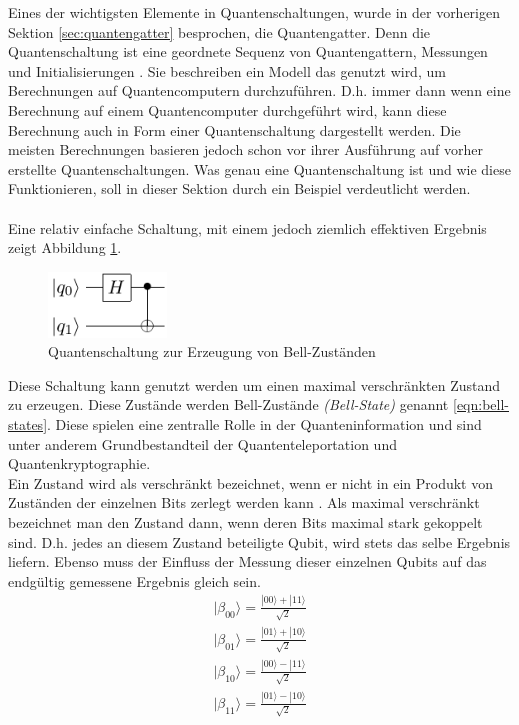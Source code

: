 Eines der wichtigsten Elemente in Quantenschaltungen, wurde in der vorherigen Sektion \ref{sec:quantengatter} besprochen, die Quantengatter. Denn die Quantenschaltung ist eine geordnete Sequenz von Quantengattern, Messungen und Initialisierungen \cite{Qiskit-Textbook}. Sie beschreiben ein Modell das genutzt wird, um Berechnungen auf Quantencomputern durchzuf\"uhren. D.h. immer dann wenn eine Berechnung auf einem Quantencomputer durchgef\"uhrt wird, kann diese Berechnung auch in Form einer Quantenschaltung dargestellt werden. Die meisten Berechnungen basieren jedoch schon vor ihrer Ausf\"uhrung auf vorher erstellte Quantenschaltungen. Was genau eine Quantenschaltung ist und wie diese Funktionieren, soll in dieser Sektion durch ein Beispiel verdeutlicht werden.\\\\
Eine relativ einfache Schaltung, mit einem jedoch ziemlich effektiven Ergebnis zeigt Abbildung \ref{fig:bell-circuit}.
\begin{figure}[h]
  \centering
  \includegraphics[width=0.28\textwidth]{figures/bell.pdf}
  \caption{Quantenschaltung zur Erzeugung von Bell-Zust\"anden}
  \label{fig:bell-circuit}
\end{figure}
Diese Schaltung kann genutzt werden um einen maximal verschr\"ankten Zustand zu erzeugen. Diese Zust\"ande werden Bell-Zust\"ande \textit{(Bell-State)} genannt \ref{eqn:bell-states}. Diese spielen eine zentralle Rolle in der Quanteninformation und sind unter anderem Grundbestandteil der Quantenteleportation und Quantenkryptographie.\\
Ein Zustand wird als verschr\"ankt bezeichnet, wenn er nicht in ein Produkt von Zust\"anden der einzelnen Bits zerlegt werden kann \cite{Homeister-2022}. Als maximal verschr\"ankt bezeichnet man den Zustand dann, wenn deren Bits maximal stark gekoppelt sind. D.h. jedes an diesem Zustand beteiligte Qubit, wird stets das selbe Ergebnis liefern. Ebenso muss der Einfluss der Messung dieser einzelnen Qubits auf das endg\"ultig gemessene Ergebnis gleich sein.
\begin{equation}
  \begin{aligned} \label{eqn:bell-states}
    |\beta_{00}\rangle = \frac{|00\rangle + |11\rangle}{\sqrt{2}}\\
    |\beta_{01}\rangle = \frac{|01\rangle + |10\rangle}{\sqrt{2}}\\
    |\beta_{10}\rangle = \frac{|00\rangle - |11\rangle}{\sqrt{2}}\\
    |\beta_{11}\rangle = \frac{|01\rangle - |10\rangle}{\sqrt{2}} 
  \end{aligned}
\end{equation}
